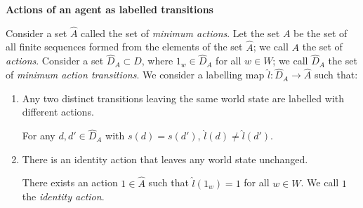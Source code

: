 

\textbf{Actions of an agent as labelled transitions}\label{sec:Agent actions as labelled transitions}

Consider a set $\hat{A}$ called the set of \textit{minimum actions}.
Let the set $A$ be the set of all finite  sequences formed from the elements of the set $\hat{A}$; we call $A$ the set of \textit{actions}.
Consider a set $\hat{D}_{A} \subset D$, where $1_{w} \in \hat{D}_{A}$ for all $w \in W$; we call $\hat{D}_{A}$ the set of \textit{minimum action transitions}.
We consider a labelling map $\hat{l}: \hat{D}_{A} \to \hat{A}$ such that:

\begin{enumerate}
    \item Any two distinct transitions leaving the same world state are labelled with different actions.
    \begin{action_condition}\label{actcon:action-gives-single-outcome}
        For any $d,d' \in \hat{D}_{A}$ with $s(d)=s(d')$, $\hat{l}(d) \neq \hat{l}(d')$.
    \end{action_condition}

    \item There is an identity action that leaves any world state unchanged.
    \begin{action_condition}\label{actcon:identity-action}
        There exists an action $1 \in \hat{A}$ such that $\hat{l}(1_{w})=1$ for all $w \in W$.
        We call $1$ the \textit{identity action}.
    \end{action_condition}
    
\end{enumerate}


